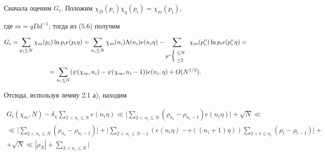 \begin{pf}
\begin{equation}
\end{equation}





Сначала оценим $G_i$. Положим $\chi_D(p_i)\chi_q(p_i)= \chi_m(p_i)$,


где $m=q D d^{-1}$, тогда из (5.6) получим


\begin{multline*}


G_i=\sum_{p_i\le N}\chi_m(p_i)\ln p_i e(p_i\eta)=


\sum_{n_i\le N}\chi_m(n_i)\Lambda (n_i) e(n_i\eta)-


\sum_{


p^\nu\Big\{ \begin{array}{l}\hspace{-1mm}\scriptstyle \le N\\


\hspace{-1mm}\scriptstyle\ge 2\end{array}


}


\chi_m(p_i^\nu)\ln p_i e(p_i^\nu\eta)=\\


%


=\sum_{n_i\le N}(\psi(\chi_m, n_i)-


\psi(\chi_m, n_i-1)) e(n_i,\eta)+O(N^{1/2}).


\end{multline*}


Отсюда, используя лемму 2.1 а), находим


\begin{multline*}


G_i(\chi_m, N)-\delta_\chi\sum_{2< n_i\le N} e(n_i\eta)\ll\bigg|


\sum_{2< n_i\le N}(\rho_{n_i}-\rho_{n_i-1}) e(n_i\eta)\bigg|+\sqrt{N}\ll\\


%


\ll \bigg|


\sum_{2< n_i\le N}(\rho_{n_i}-\rho_{n_i-1})\bigg|+\bigg|\sum_{2<n_i\le N-1}


( e(n_i\eta)-e((n_i+1)\eta))


\sum_{2< t\le n_i}(\rho_t-\rho_{t-1})\bigg|+ \\


%


+\sqrt{N}\ll


|\rho_N|+ \sum_{2< n_i\le N}|



\end{multline*}
\end{pf}
